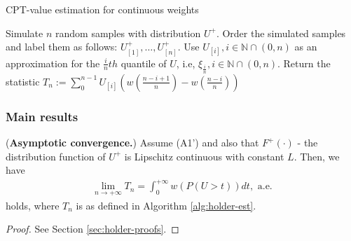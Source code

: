 \documentclass[11pt,letterpaper,english]{article}
\begin{document}
\begin{algorithm}
\caption{CPT-value estimation for \holder continuous weights}
\label{alg:holder-est}
\begin{algorithmic}[1]
\State Simulate $n$ random samples with distribution $U^+$.
\State Order the simulated samples and label them as follows: 
$U^+_{[1]},\ldots,U^+_{[n]}$.
\State Use $U_{[i]}, i\in \mathbb{N}\cap (0,n)$ as an approximation for the $\frac{i}{n} th$ quantile of $U$, i.e, $\xi_{\frac{i}{n}}, i\in \mathbb{N}\cap (0,n)$.
\State Return the statistic 
$T_n:=\sum_0^{n-1} U_{[i]} (w(\frac{n-i+1}{n})- w(\frac{n-i}{n}) )$
\end{algorithmic}
\end{algorithm}

\subsubsection*{Main results}
\begin{proposition}(\textbf{Asymptotic convergence.})
\label{prop:holder-asymptotic}
Assume (A1') and also that $F^+(\cdot)$ - the distribution function of $U^+$ is Lipschitz continuous with constant $L$. Then, we have
\begin{align}
\lim_{n\rightarrow +\infty} 
T_n
=
\int_0^{+\infty} w(P(U>t)) dt, \text{   a.e.}
\end{align}
holds, where $T_n$ is as defined in Algorithm \ref{alg:holder-est}.
\end{proposition}
\begin{proof}
See Section \ref{sec:holder-proofs}.
\end{proof}

\end{document}
